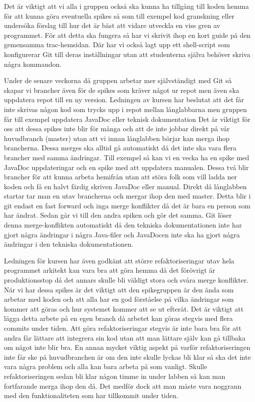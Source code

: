 Det är viktigt att vi alla i gruppen också ska kunna ha tillgång till koden hemma för att kunna göra eventuella spikes så som till exempel kod granskning eller undersöka förslag till hur det är bäst att vidare utveckla en viss gren av programmet. För att detta ska fungera så har vi skrivit ihop en kort guide på den gemensamma trac-hemsidan. Där har vi också lagt upp ett shell-script som konfigurerar Git till deras inställningar utan att studenterna själva behöver skriva några kommandon.

Under de senare veckorna då gruppen arbetar mer självständigt med Git så skapar vi brancher även för de spikes som kräver något ur repot men även ska uppdatera repot till en ny version. Ledningen av kursen har beslutat att det får inte skrivas någon kod som trycks upp i repot mellan långlabbarna men gruppen får till exempel uppdatera JavaDoc eller teknisk dokumentation Det är viktigt för oss att dessa spikes inte blir för många och att de inte jobbar direkt på vår huvudbranch (master) utan att vi innan långlabben börjar kan merga ihop brancherna. Dessa merges ska alltid gå automatiskt då det inte ska vara flera brancher med samma ändringar. Till exempel så kan vi en vecka ha en spike med JavaDoc uppdateringar och en spike med att uppdatera manualen. Dessa två blir brancher för att kunna arbeta hemifrån utan att störa folk som vill ladda ner koden och få en halvt färdig skriven JavaDoc eller manual. Direkt då långlabben startar tar man en utav brancherna och mergar ihop den med master. Detta blir i git endast en fast forward och inga merge konflikter då det är bara en person som har ändrat. Sedan går vi till den andra spiken och gör det samma. Git löser denna merge-konflikten automatiskt då den tekniska dokumentationen inte har gjort några ändringar i några Java-filer och JavaDocen inte ska ha gjort några ändringar i den tekniska dokumentationen.

Ledningen för kursen har även godkänt att större refaktoriseringar utav hela programmet arkitekt kan vara bra att göra hemma då det förövrigt är produktionsstop då det annars skulle bli väldigt stora och svåra merge konflikter. När vi har dessa spikes är det viktigt att den spikegruppen är den ända som arbetar med koden och att alla har en god förståelse på vilka ändringar som kommer att göras och hur systemet kommer att se ut efteråt. Det är viktigt att lägga detta arbete på en egen branch då arbetet kan göras stegvis med flera commits under tiden. Att göra refaktoriseringar stegvis är inte bara bra för att andra får lättare att integrera sin kod utan att man lättare själv kan gå tillbaka om något inte blir bra. En annan mycket viktig aspekt på varför refaktoriseringen inte får ske på huvudbranchen är om den inte skulle lyckas bli klar så ska det inte vara några problem och alla kan bara arbeta på som vanligt. Skulle refaktoriseringen sedan bli klar någon timme in under labben så kan man fortfarande merga ihop den då. Det medför dock att man måste vara noggrann med den funktionaliteten som har tillkommit under tiden.

